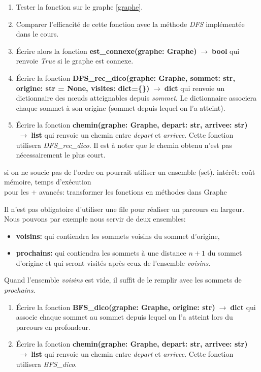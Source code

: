 \documentclass[a4paper,11pt]{article}
\begin{document}
\begin{Form}
\begin{exo}
\begin{enumerate}
\item Tester la fonction sur le graphe \ref{graphe}.
\item Comparer l'efficacité de cette fonction avec la méthode \emph{DFS} implémentée dans le cours.
\item Écrire alors la fonction \textbf{est\_connexe(graphe: Graphe)$\;\rightarrow\;$bool} qui renvoie \emph{True} si le graphe est connexe.
\item Écrire la fonction \textbf{DFS\_rec\_dico(graphe: Graphe, sommet: str, origine: str = None, visites: dict=\{\})$\;\rightarrow\;$dict} qui renvoie un dictionnaire des nœuds atteignables depuis \emph{sommet}. Le dictionnaire associera chaque sommet à son origine (sommet depuis lequel on l'a atteint).
\item Écrire la fonction \textbf{chemin(graphe: Graphe, depart: str, arrivee: str)$\;\rightarrow\;$list} qui renvoie un chemin entre \emph{depart} et \emph{arrivee}. Cette fonction utilisera \emph{DFS\_rec\_dico}. Il est à noter que le chemin obtenu n'est pas nécessairement le plus court.
\end{enumerate}
\begin{commentprof}
si on ne soucie pas de l'ordre on pourrait utiliser un ensemble (set). intérêt: coût mémoire, temps d'exécution\\
pour les + avancés: transformer les fonctions en méthodes dans Graphe
\end{commentprof}
\end{exo}
\begin{exo}
Il n'est pas obligatoire d'utiliser une file pour réaliser un parcours en largeur. Nous pouvons par exemple nous servir de deux ensembles:
\begin{itemize}
\item \textbf{voisins:} qui contiendra les sommets voisins du sommet d'origine,
\item \textbf{prochains:} qui contiendra les sommets à une distance $n+1$ du sommet d'origine et qui seront visités après ceux de l'ensemble \emph{voisins}.
\end{itemize}
Quand l'ensemble \emph{voisins} est vide, il suffit de le remplir avec les sommets de \emph{prochains}.
\begin{enumerate}
\item Écrire la fonction \textbf{BFS\_dico(graphe: Graphe, origine: str)$\;\rightarrow\;$dict} qui associe chaque sommet au sommet depuis lequel on l'a atteint lors du parcours en profondeur.
\item Écrire la fonction \textbf{chemin(graphe: Graphe, depart: str, arrivee: str)$\;\rightarrow\;$list} qui renvoie un chemin entre \emph{depart} et \emph{arrivee}. Cette fonction utilisera \emph{BFS\_dico}.
\end{enumerate}
\end{exo}
\end{Form}
\end{document}
